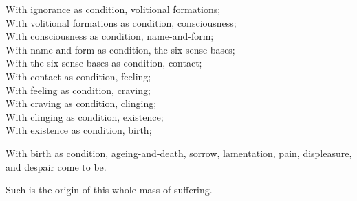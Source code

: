 \begin{english-verses}
  With ignorance as condition, volitional formations;\\
  With volitional formations as condition, consciousness;\\
  With consciousness as condition, name-and-form;\\
  With name-and-form as condition, the six sense bases;\\
  With the six sense bases as condition, contact;\\
  With contact as condition, feeling;\\
  With feeling as condition, craving;\\
  With craving as condition, clinging;\\
  With clinging as condition, existence;\\
  With existence as condition, birth;\\
\end{english-verses}
  \begin{english-hangtogether-verses}
  With birth as condition, ageing-and-death, sorrow, lamentation, pain, displeasure, and despair come to be.\\
  \end{english-hangtogether-verses}
  \begin{english-hangtogether-verses}
  Such is the origin of this whole mass of suffering.
  \end{english-hangtogether-verses}


